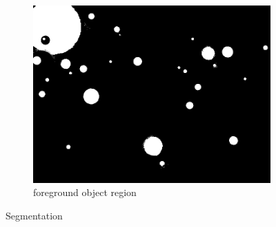 \documentclass[a4paper,16pt]{article}
\begin{document}
\begin{figure}[h!]
\begin{subfigure}[h!]{0.45\linewidth}
			\includegraphics[width=\linewidth]{ballthl}
			\caption{foreground object region}
		\end{subfigure}%
		\caption{Segmentation}
	\end{figure}
	\newpage
\end{document}
